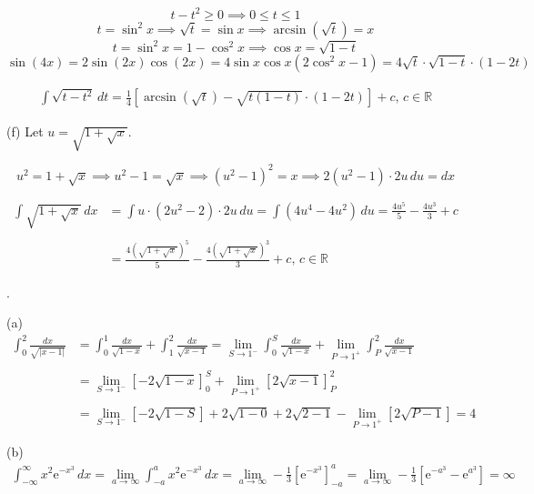 \documentclass{article}
\begin{document}
\[t-t^2 \geq 0\implies 0\leq t \leq 1\]
\[t=\sin^2x \implies\sqrt t = \sin x\implies\arcsin\left(\sqrt t\right) = x\]
\[t=\sin^2x=1-\cos^2x\implies \cos x= \sqrt{1-t}\]
\[\sin(4x)=2\sin(2x)\cos(2x)=4\sin x\cos x\left(2\cos^2x-1\right)=4\sqrt t\cdot\sqrt{1-t}\cdot(1-2t)\]

\begin{align*}
\int\sqrt{t-t^2}\,dt=\boxed{\frac14\left[\arcsin\left(\sqrt t\right)-\sqrt{t(1-t)}\cdot(1-2t)\right]+c,\,c\in\mathbb{R}}
\end{align*}

\hfill

\noindent (f) Let $u=\sqrt{1+\sqrt x}$.

\[u^2 = 1+\sqrt x\implies u^2-1 = \sqrt x\implies\left(u^2-1\right)^2 = x\implies2\left(u^2-1\right)\cdot 2u\,du = dx\]

\begin{align*}
\int \sqrt{1+\sqrt{x}}\,dx&=\int u \cdot(2u^2-2)\cdot 2u\,du=\int\left(4u^4-4u^2\right)\,du=\frac{4u^5}5-\frac{4u^3}{3} + c\\\\&=\boxed{\frac{4\left(\sqrt{1+\sqrt x}\right)^5}5-\frac{4\left(\sqrt{1+\sqrt x}\right)^3}3+c,\,c\in\mathbb{R}}\end{align*}

\hfill

.

\hfill

\noindent (a)
\begin{align*}
\int_0^2\frac{dx}{\sqrt{|x-1|}}&=\int_0^1\frac{dx}{\sqrt{1-x}} + \int_1^2\frac{dx}{\sqrt{x-1}}=\lim_{S\to1^-}\int_0^S\frac{dx}{\sqrt{1-x}}+\lim_{P\to1^+}\int_P^2\frac{dx}{\sqrt{x-1}}\\\\&=\lim_{S\to1^-}\left[-2\sqrt{1-x}\right]_0^S+\lim_{P\to1^+}\left[2\sqrt{x-1}\right]_P^2\\\\&=\lim_{S\to1^-}\left[-2\sqrt{1-S}\right]+2\sqrt{1-0}+2\sqrt{2-1}-\lim_{P\to1^+}\left[2\sqrt{P-1}\right]=\boxed4
\end{align*}

\hfill

\noindent (b)
\begin{align*}\int_{-\infty}^{\infty} x^2\mathrm{e}^{-x^{3}}\,dx=\lim_{a\to\infty}\int_{-a}^{a} x^2\mathrm{e}^{-x^{3}}\,dx=\lim_{a\to\infty}-\frac13\left[\mathrm{e}^{-x^3}\right]_{-a}^a=\lim_{a\to\infty}-\frac13\left[\mathrm{e}^{-a^3}-\mathrm{e}^{a^3}\right]=\boxed\infty\end{align*}
\end{document}
